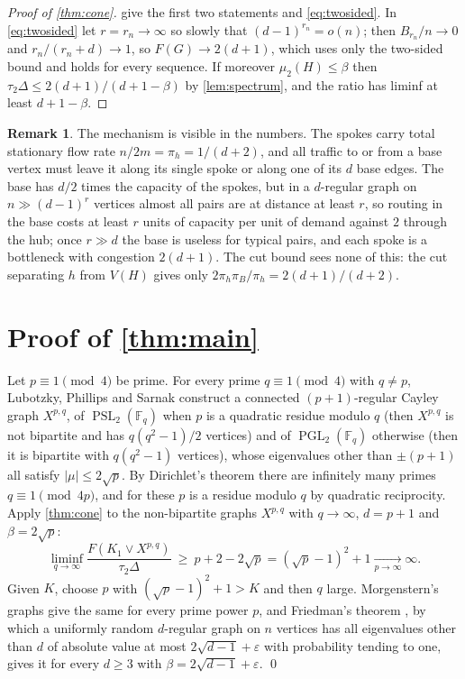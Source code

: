\documentclass[11pt]{amsart}
\theoremstyle{definition}
\newtheorem{remark}[theorem]{Remark}
\newcommand{\F}{\mathbb{F}}
\DeclareMathOperator{\PSL}{PSL}
\DeclareMathOperator{\PGL}{PGL}
\begin{document}
\begin{proof}[Proof of \cref{thm:cone}]
 give the first two statements and \eqref{eq:twosided}. In \eqref{eq:twosided} let $r=r_n\to\infty$ so slowly that $(d-1)^{r_n}=o(n)$; then $B_{r_n}/n\to0$ and $r_n/(r_n+d)\to1$, so $F(G)\to2(d+1)$, which uses only the two-sided bound and holds for every sequence. If moreover $\mu_2(H)\le\beta$ then $\tau_2\Delta\le2(d+1)/(d+1-\beta)$ by \cref{lem:spectrum}, and the ratio has liminf at least $d+1-\beta$.
\end{proof}

\begin{remark}
The mechanism is visible in the numbers. The spokes carry total stationary flow rate $n/2m=\pi_h=1/(d+2)$, and all traffic to or from a base vertex must leave it along its single spoke or along one of its $d$ base edges. The base has $d/2$ times the capacity of the spokes, but in a $d$-regular graph on $n\gg(d-1)^r$ vertices almost all pairs are at distance at least $r$, so routing in the base costs at least $r$ units of capacity per unit of demand against $2$ through the hub; once $r\gg d$ the base is useless for typical pairs, and each spoke is a bottleneck with congestion $2(d+1)$. The cut bound sees none of this: the cut separating $h$ from $V(H)$ gives only $2\pi_h\pi_B/\pi_h=2(d+1)/(d+2)$.
\end{remark}

\section{Proof of \texorpdfstring{\cref{thm:main}}{the main theorem}}

Let $p\equiv1\pmod4$ be prime. For every prime $q\equiv1\pmod4$ with $q\ne p$, Lubotzky, Phillips and Sarnak \cite{LPS} construct a connected $(p+1)$-regular Cayley graph $X^{p,q}$, of $\PSL_2(\F_q)$ when $p$ is a quadratic residue modulo $q$ (then $X^{p,q}$ is not bipartite and has $q(q^2-1)/2$ vertices) and of $\PGL_2(\F_q)$ otherwise (then it is bipartite with $q(q^2-1)$ vertices), whose eigenvalues other than $\pm(p+1)$ all satisfy $|\mu|\le2\sqrt p$. By Dirichlet's theorem there are infinitely many primes $q\equiv1\pmod{4p}$, and for these $p$ is a residue modulo $q$ by quadratic reciprocity. Apply \cref{thm:cone} to the non-bipartite graphs $X^{p,q}$ with $q\to\infty$, $d=p+1$ and $\beta=2\sqrt p$:
\[
\liminf_{q\to\infty}\frac{F(K_1\vee X^{p,q})}{\tau_2\Delta}\ \ge\ p+2-2\sqrt p=(\sqrt p-1)^2+1\xrightarrow[p\to\infty]{}\infty .
\]
Given $K$, choose $p$ with $(\sqrt p-1)^2+1>K$ and then $q$ large. Morgenstern's graphs \cite{Morgenstern} give the same for every prime power $p$, and Friedman's theorem \cite{Friedman}, by which a uniformly random $d$-regular graph on $n$ vertices has all eigenvalues other than $d$ of absolute value at most $2\sqrt{d-1}+\varepsilon$ with probability tending to one, gives it for every $d\ge3$ with $\beta=2\sqrt{d-1}+\varepsilon$. \qed
\end{document}

